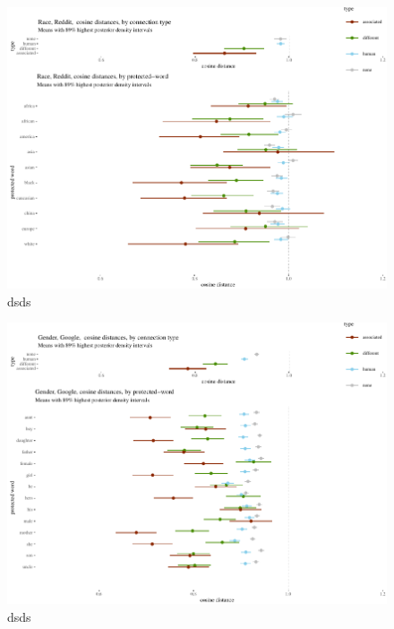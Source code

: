 \documentclass[
  10pt,
  dvipsnames,enabledeprecatedfontcommands]{scrartcl}
\begin{document}
\begin{figure}


\begin{center}\includegraphics[width=1.1\linewidth]{paperDraft6_files/figure-latex/unnamed-chunk-12-1} \end{center}
\caption{dsds}
\label{fig:raceReddit}
\end{figure}

\begin{figure}


\begin{center}\includegraphics[width=1.1\linewidth]{paperDraft6_files/figure-latex/unnamed-chunk-13-1} \end{center}
\caption{dsds}
\label{fig:genderGoogle}
\end{figure}
\end{document}
